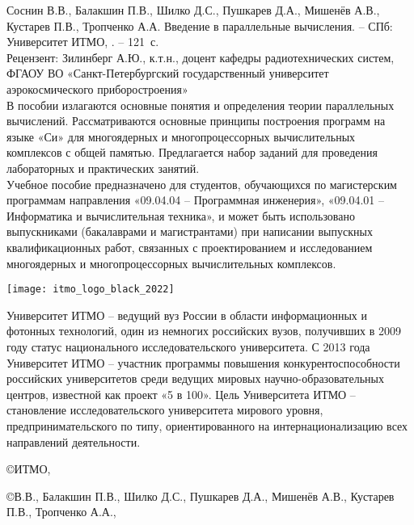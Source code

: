 \thispagestyle{empty}
 
Соснин В.В., Балакшин П.В., Шилко Д.С., Пушкарев Д.А., Мишенёв А.В., Кустарев П.В., Тропченко А.А. Введение в параллельные вычисления. -- СПб: Университет ИТМО, \the\year. -- %
121~с. \\

Рецензент: Зилинберг А.Ю., к.т.н., доцент кафедры радиотехнических систем, ФГАОУ ВО «Санкт-Петербургский государственный университет аэрокосмического приборостроения» \\

В пособии излагаются основные понятия и определения теории параллельных вычислений. Рассматриваются основные принципы построения программ на языке «Си» для многоядерных и многопроцессорных вычислительных комплексов с общей памятью. Предлагается набор заданий для проведения лабораторных и практических занятий. \\

Учебное пособие предназначено для студентов, обучающихся по магистерским программам направления «09.04.04 -- Программная инженерия», «09.04.01 -- Информатика и вычислительная техника», и может быть использовано выпускниками (бакалаврами и магистрантами) при написании выпускных квалификационных работ, связанных с проектированием и исследованием многоядерных и многопроцессорных вычислительных комплексов.

\vspace*{\fill}

\begin{flushright}
    \texttt{[image: itmo\_logo\_black\_2022]}
\end{flushright}

Университет ИТМО – ведущий вуз России в области информационных и фотонных технологий, один из немногих российских вузов, получивших в 2009 году статус национального исследовательского университета. С 2013 года Университет ИТМО -- участник программы повышения конкурентоспособности российских университетов среди ведущих мировых научно-образовательных центров, известной как проект «5 в 100». Цель Университета ИТМО -- становление исследовательского университета мирового уровня, предпринимательского по типу, ориентированного на интернационализацию всех направлений деятельности.
\begin{flushright}
    \copyright{} ИТМО, \the\year
    
    \copyright{} В.В., Балакшин П.В., Шилко Д.С., Пушкарев Д.А.,
    Мишенёв А.В., Кустарев П.В., Тропченко А.А., \the\year
\end{flushright}
